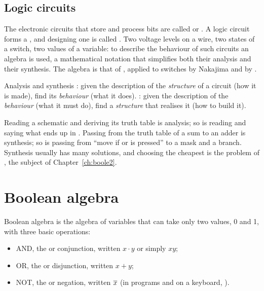\subsection{Logic circuits}

The electronic circuits that store and process bits are called
 or . A logic circuit forms a
, and designing one is called .
Two voltage levels on a wire, two states of a switch, two values of a
variable: to describe the behaviour of such circuits an algebra is used, a
mathematical notation that simplifies both their analysis and their synthesis.
The algebra is that of \citet{boole1854}, applied to switches by Nakajima and
by \citet{shannon1938}.

\begin{definition}{Analysis and synthesis}
: given the description of the \emph{structure} of a circuit
(how it is made), find its \emph{behaviour} (what it does).
: given the description of the \emph{behaviour} (what it must
do), find a \emph{structure} that realises it (how to build it).
\end{definition}

Reading a schematic and deriving its truth table is analysis; so is reading
 and saying what ends up in . Passing from the
truth table of a sum to an adder is synthesis; so is passing from ``move if
 or  is pressed'' to a mask and a branch. Synthesis
usually has many solutions, and choosing the cheapest is the problem of
, the subject of Chapter~\ref{ch:boole2}.

\section{Boolean algebra}

\begin{definition}{Boolean algebra}
 is the algebra of variables that can take only two
values, 0 and 1, with three basic operations:
\begin{itemize}[nosep]
\item AND, the  or conjunction, written $x\cdot y$ or
  simply $xy$;
\item OR, the  or disjunction, written $x+y$;
\item NOT, the  or negation, written $\overline{x}$ (in programs
  and on a keyboard, ).
\end{itemize}
\end{definition}

